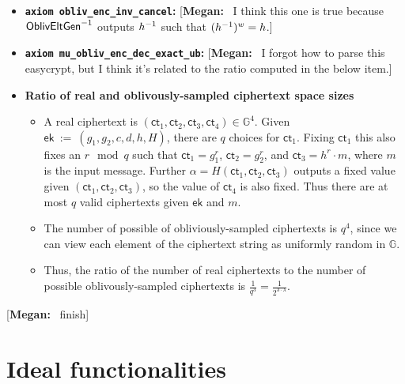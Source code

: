 \documentclass[11pt,letterpaper]{article}
\newcommand{\doclearpage}{%
  \iffull\clearpage\else\fi
}
\newcommand{\authnote}[2]{[{\color{red}\textbf{#1:}}~{\color{blue} #2}]}
\newcommand{\authnote}[2]{}
\newcommand{\megan}[1]{\authnote{Megan}{#1}}
\theoremstyle{plain} %
\theoremstyle{definition} %
\theoremstyle{remark} %
\newcommand{\code}[1]{\texttt{#1}} %
\newcommand{\eqdef}{\ {:=} \ }
\newcommand{\SecParam}{\lambda}
\newcommand{\EncKey}{\mathsf{ek}}
\newcommand{\Msg}{m}
\newcommand{\Ct}{\mathsf{ct}}
\newcommand{\Rand}{r}
\newcommand{\Group}{\mathbb{G}}
\newcommand{\GrpOrd}{q}
\newcommand{\GrpEltC}{c}
\newcommand{\GrpEltD}{d}
\newcommand{\GrpEltH}{h}
\newcommand{\Generator}{g}
\newcommand{\Hash}{H}
\newcommand{\Tag}{\alpha}
\begin{document}
\begin{itemize}
\item \textbf{\code{axiom obliv\_enc\_inv\_cancel}:} \megan{I think this one is true because ${\mathsf{OblivEltGen}}^{-1}$ outputs $\Inv{\GrpEltH}$ such that $(\Inv{\GrpEltH})^{\OrdW} = \GrpEltH$.}

\item \textbf{\code{axiom mu\_obliv\_enc\_dec\_exact\_ub}:} \megan{I forgot how to parse this easycrypt, but I think it's related to the ratio computed in the below item.}

\item \textbf{Ratio of real and oblivously-sampled ciphertext space sizes}
\begin{itemize}[nolistsep]
    \item A real ciphertext is $(\Ct_1,\Ct_2,\Ct_3,\Ct_4) \in \Group^4$. Given $\EncKey \eqdef (\Generator_1, \Generator_2, \GrpEltC, \GrpEltD, \GrpEltH, \Hash)$, there are $q$ choices for $\Ct_1$. Fixing $\Ct_1$ this also fixes an $\Rand \mod \GrpOrd$ such that $\Ct_1 = \Generator_1^r$, $\Ct_2 = \Generator_2^r$, and $\Ct_3 = \GrpEltH^r\cdot \Msg$, where $\Msg$ is the input message. Further $\Tag = \Hash(\Ct_1, \Ct_2, \Ct_3)$ outputs a fixed value given $(\Ct_1, \Ct_2, \Ct_3)$, so the value of $\Ct_4$ is also fixed. Thus there are at most $\GrpOrd$ valid ciphertexts given $\EncKey$ and $\Msg$.

    \item The number of possible of obliviously-sampled ciphertexts is $\GrpOrd^4$, since we can view each element of the ciphertext string as uniformly random in $\Group$.

    \item Thus, the ratio of the number of real ciphertexts to the number of possible oblivously-sampled ciphertexts is $\frac{1}{\GrpOrd^3} = \frac{1}{2^{3\cdot\SecParam}}$.
\end{itemize}

\end{itemize}

\megan{finish}
\doclearpage
\section{Ideal functionalities}
\label{sec:ideal-functionalities}
\end{document}
